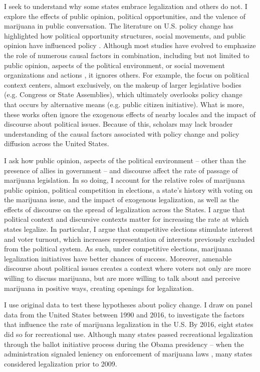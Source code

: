 I seek to understand why some states embrace legalization and others do not. I explore the effects of public opinion, political opportunities, and the valence of marijuana in public conversation. The literature on U.S. policy change has highlighted how political opportunity structures, social movements, and public opinion have influenced policy \citep{burstein_and_linton_2002}. Although most studies have evolved to emphasize the role of numerous causal factors in combination, including but not limited to public opinion, aspects of the political environment, or social movement organizations and actions \citep{burstein_and_linton_2002}, it ignores others. For example, the focus on political context centers, almost exclusively, on the makeup of larger legislative bodies (e.g. Congress or State Assemblies), which ultimately overlooks policy change that occurs by alternative means (e.g. public citizen initiative). What is more, these works often ignore the exogenous effects of nearby locales and the impact of discourse about political issues. Because of this, scholars may lack broader understanding of the causal factors associated with policy change and policy diffusion across the United States. 

I ask how public opinion, aspects of the political environment -- other than the presence of allies in government -- and discourse affect the rate of passage of marijuana legislation. In so doing, I account for the relative roles of marijuana public opinion, political competition in elections, a state's history with voting on the marijuana issue, and the impact of exogenous legalization, as well as the effects of discourse on the spread of legalization across the States. I argue that political context and discursive contexts matter for increasing the rate at which states legalize. In particular, I argue that competitive elections stimulate interest and voter turnout, which increases representation of interests previously excluded from the political system. As such, under competitive elections, marijuana legalization initiatives have better chances of success. Moreover, amenable discourse about political issues creates a context where voters not only are more willing to discuss marijuana, but are more willing to talk about and perceive marijuana in positive ways, creating openings for legalization. 


I use original data to test these hypotheses about policy change. I draw on panel data from the United States between 1990 and 2016, to investigate the factors that influence the rate of marijuana legalization in the U.S. By 2016, eight states did so for recreational use. Although many states passed recreational legalization through the ballot initiative process during the Obama presidency -- when the administration signaled leniency on enforcement of marijuana laws \citep{ogden_2009}, many states considered legalization prior to 2009.



